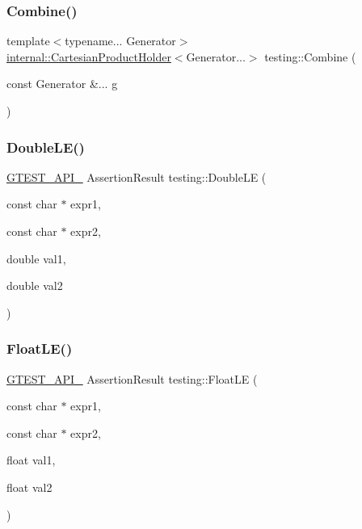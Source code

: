 \subsubsection{\texorpdfstring{Combine()}{Combine()}}
{\footnotesize\ttfamily template$<$typename... Generator$>$ \\
\hyperlink{classtesting_1_1internal_1_1CartesianProductHolder}{internal\+::\+Cartesian\+Product\+Holder}$<$Generator...$>$ testing\+::\+Combine (\begin{DoxyParamCaption}\item[{const Generator \&...}]{g }\end{DoxyParamCaption})}

\mbox{\label{namespacetesting_a84c020b981d0eb4eabfb0feda155aaaf}} 
\subsubsection{\texorpdfstring{Double\+L\+E()}{DoubleLE()}}
{\footnotesize\ttfamily \hyperlink{gtest-port_8h_aa73be6f0ba4a7456180a94904ce17790}{G\+T\+E\+S\+T\+\_\+\+A\+P\+I\+\_\+} Assertion\+Result testing\+::\+Double\+LE (\begin{DoxyParamCaption}\item[{const char $\ast$}]{expr1,  }\item[{const char $\ast$}]{expr2,  }\item[{double}]{val1,  }\item[{double}]{val2 }\end{DoxyParamCaption})}

\mbox{\label{namespacetesting_a69106491c2e7f50e50da0ce5e8ae4374}} 
\subsubsection{\texorpdfstring{Float\+L\+E()}{FloatLE()}}
{\footnotesize\ttfamily \hyperlink{gtest-port_8h_aa73be6f0ba4a7456180a94904ce17790}{G\+T\+E\+S\+T\+\_\+\+A\+P\+I\+\_\+} Assertion\+Result testing\+::\+Float\+LE (\begin{DoxyParamCaption}\item[{const char $\ast$}]{expr1,  }\item[{const char $\ast$}]{expr2,  }\item[{float}]{val1,  }\item[{float}]{val2 }\end{DoxyParamCaption})}

